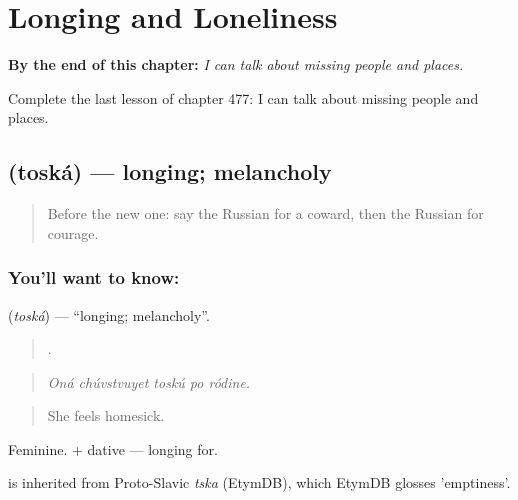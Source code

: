 
\chapter{Longing and Loneliness}
\label{ch:ru-longing-and-loneliness}

\begin{chapteropening}
\textbf{By the end of this chapter:} \emph{I can talk about missing people and places.}

Complete the last lesson of chapter 477: I can talk about missing people and places.
\end{chapteropening}

\section[\texorpdfstring{\ru{тоска} (toská)}{тоска (toská)}]{ (toská) — longing; melancholy}

\label{lesson:RU-C477-toska}



\begin{quote}
Before the new one: say the Russian for a coward, then the Russian for courage.
\end{quote}

\subsection*{You'll want to know: }
\textbf{} (\emph{toská}) — \textquotedblleft{}longing; melancholy\textquotedblright{}.

\begin{quote}
    .
\end{quote}

\begin{quote}
\emph{Oná chúvstvuyet toskú po ródine.}
\end{quote}

\begin{quote}
She feels homesick.
\end{quote}

Feminine. \emph{ } + dative — longing for.

\begin{cousinweb}
\emph{} is inherited from Proto-Slavic \emph{tska} (EtymDB), which EtymDB glosses 'emptiness'.
\end{cousinweb}

